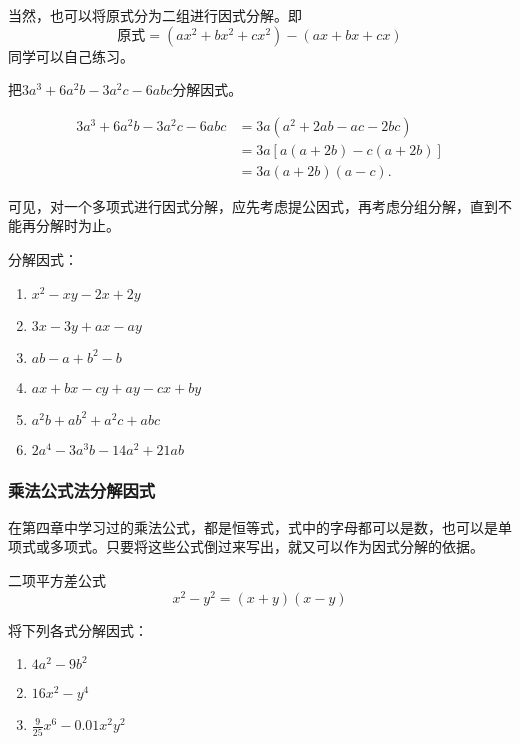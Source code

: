 当然，也可以将原式分为二组进行因式分解。即
\[\text{原式}=(ax^2+bx^2+cx^2)-(ax+bx+cx)\]
同学可以自己练习。

\begin{example}
    把$3a^3+6a^2b-3a^2c -6abc$分解因式。
\end{example}

\begin{solution}
    \[\begin{split}
        3a^3+6a^2b-3a^2c -6abc&=3a (a^2+2ab-ac-2bc)\\
    &=3a [a (a+2b) -c (a+2b) ]\\
    &=3a (a+2b) (a-c).
    \end{split}\]       
\end{solution}

可见，对一个多项式进行因式分解，应先考虑提公因式，再考虑分组分解，直到不能再分解时为止。

\begin{ex}
 分解因式：
 \begin{multicols}{2}
 \begin{enumerate}
     \item $x^2-xy-2x+2y$
     \item $3x-3y+ax-ay$
     \item $ab-a+b^2-b$
     \item $ax+bx-cy+ay-cx+by$
     \item $a^2b+ab^2+a^2c+abc$
     \item $2a^4-3a^3b-14a^2+21ab$
 \end{enumerate}  
\end{multicols}
\end{ex}

\subsubsection{乘法公式法分解因式}

在第四章中学习过的乘法公式，都是恒等式，式中的字母都可以是数，也可以是单项式或多项式。只要将这些公式倒过来写出，就又可以作为因式分解的依据。

\begin{blk}{二项平方差公式}
    \[x^2-y^2=(x+y)(x-y)\]
\end{blk}

\begin{example}
    将下列各式分解因式：
\begin{enumerate}
    \item $4a^2-9b^2$
    \item $16x^2-y^4$
    \item $\frac{9}{25}x^6-0.01 x^2y^2$
\end{enumerate}
\end{example}

